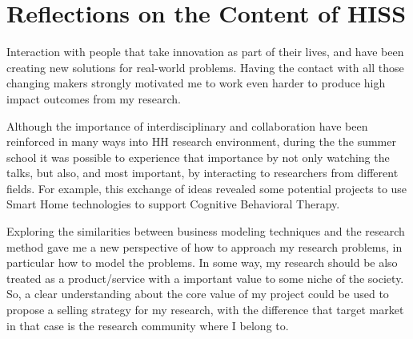 \section*{Reflections on the Content of HISS}

Interaction with people that take innovation as part of their lives, and have been creating new solutions for real-world problems. Having the contact with all those changing makers strongly motivated me to work even harder to produce high impact outcomes from my research.
 
Although the importance of interdisciplinary and collaboration have been reinforced in many ways into HH research environment, during the the summer school it was possible to experience that importance by not only watching the talks, but also, and most important, by interacting to researchers from different fields. 
For example, this exchange of ideas revealed some potential projects to use Smart Home technologies to support Cognitive Behavioral Therapy.

Exploring the similarities between business modeling techniques and the research method gave me a new perspective of how to approach my research problems, in particular how to model the problems. 
In some way, my research should be also treated as a product/service with a important value to some niche of the society. 
So, a clear understanding about the core value of my project could be used to propose a selling strategy for my research, with the difference that target market in that case is the research community where I belong to.